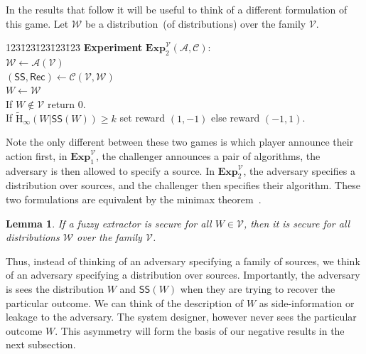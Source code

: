 \documentclass[11pt]{article}
\newcommand{\class}[1]{{\ensuremath{\mathsf{#1}}}}
\newcommand{\sketch}{\ensuremath{\class{SS}}\xspace}
\newcommand{\rec}{\ensuremath{\class{Rec}}\xspace}
\newcommand{\Hav}{\tilde{\mathrm{H}}_\infty}
\newtheorem{lemma}[theorem]{Lemma}
\newcommand{\Exp}{\mathbf{Exp}}
\begin{document}
In the results that follow it will be useful to think of a different formulation of this game.  Let $\mathcal{W}$ be a distribution~(of distributions) over the family $\mathcal{V}$.

\begin{center}
\begin{minipage}{1in}
\begin{tabbing}
123\=123\=123\=123\=123\=\kill
\textbf{Experiment} $\Exp^{\mathcal{V}}_2(\mathcal{A}, \mathcal{C})$: \\
$\mathcal{W} \leftarrow \mathcal{A}(\mathcal{V})$\\
$(\sketch, \rec)\leftarrow \mathcal{C}(\mathcal{V}, \mathcal{W})$\\
$W \leftarrow \mathcal{W}$\\
If $W\not\in \mathcal{V}$ return $0$.\\
If $\Hav(W | \sketch(W))\ge k$ set reward $(1, -1)$ else reward $(-1, 1)$.
\end{tabbing} \end{minipage} 
\end{center}

Note the only different between these two games is which player announce their action first, in $\Exp^{\mathcal{V}}_1$, the challenger announces a pair of algorithms, the adversary is then allowed to specify a source.  In $\Exp^{\mathcal{V}}_2$, the adversary specifies a distribution over sources, and the challenger then specifies their algorithm.  These two formulations are equivalent by the minimax theorem~\cite{neumann1928theorie}.

\begin{lemma}
If a fuzzy extractor is secure for all $W\in\mathcal{V}$, then it is secure for all distributions $\mathcal{W}$ over the family $\mathcal{V}$.
\end{lemma}

Thus, instead of thinking of an adversary specifying a family of sources, we think of an adversary specifying a distribution over sources.  Importantly, the adversary is sees the distribution $W$ and $\sketch(W)$ when they are trying to recover the particular outcome.  We can think of the description of $W$ as side-information or leakage to the adversary.  The system designer, however never sees the particular outcome $W$.  This asymmetry will form the basis of our negative results in the next subsection.
\end{document}
